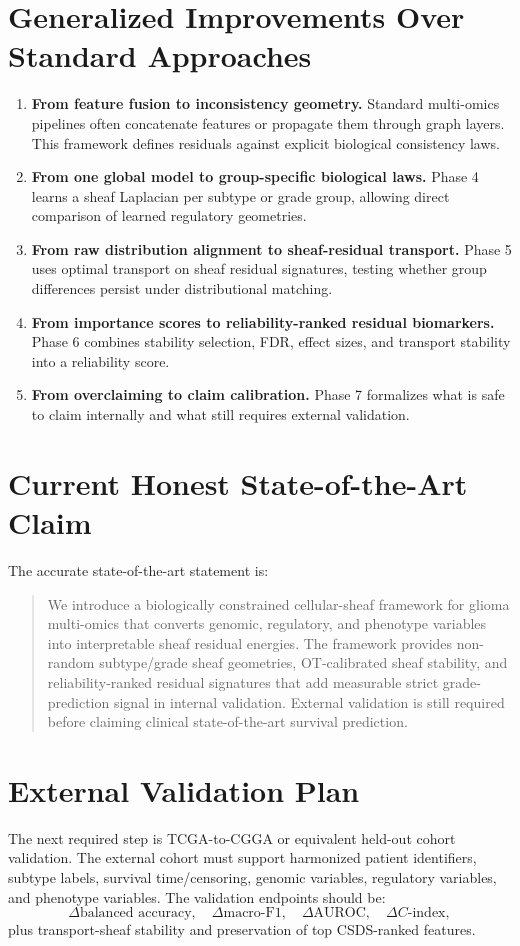 \documentclass[11pt]{article}
\begin{document}
\section{Generalized Improvements Over Standard Approaches}
\begin{enumerate}[leftmargin=*]
\item \textbf{From feature fusion to inconsistency geometry.} Standard multi-omics pipelines often concatenate features or propagate them through graph layers. This framework defines residuals against explicit biological consistency laws.
\item \textbf{From one global model to group-specific biological laws.} Phase 4 learns a sheaf Laplacian per subtype or grade group, allowing direct comparison of learned regulatory geometries.
\item \textbf{From raw distribution alignment to sheaf-residual transport.} Phase 5 uses optimal transport on sheaf residual signatures, testing whether group differences persist under distributional matching.
\item \textbf{From importance scores to reliability-ranked residual biomarkers.} Phase 6 combines stability selection, FDR, effect sizes, and transport stability into a reliability score.
\item \textbf{From overclaiming to claim calibration.} Phase 7 formalizes what is safe to claim internally and what still requires external validation.
\end{enumerate}

\section{Current Honest State-of-the-Art Claim}
The accurate state-of-the-art statement is:
\begin{quote}
We introduce a biologically constrained cellular-sheaf framework for glioma multi-omics that converts genomic, regulatory, and phenotype variables into interpretable sheaf residual energies. The framework provides non-random subtype/grade sheaf geometries, OT-calibrated sheaf stability, and reliability-ranked residual signatures that add measurable strict grade-prediction signal in internal validation. External validation is still required before claiming clinical state-of-the-art survival prediction.
\end{quote}

\section{External Validation Plan}
The next required step is TCGA-to-CGGA or equivalent held-out cohort validation. The external cohort must support harmonized patient identifiers, subtype labels, survival time/censoring, genomic variables, regulatory variables, and phenotype variables. The validation endpoints should be:
\[
\Delta \text{balanced accuracy},\quad \Delta \text{macro-F1},\quad \Delta \text{AUROC},\quad \Delta C\text{-index},
\]
plus transport-sheaf stability and preservation of top CSDS-ranked features.
\end{document}
